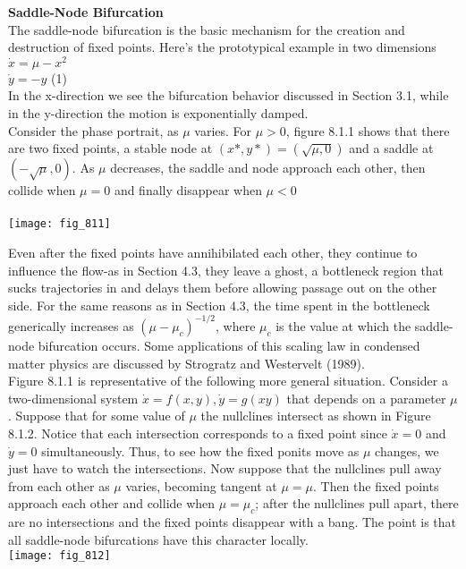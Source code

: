 \documentclass{article}
\newcommand\tab[1][1cm]{\hspace*{#1}}
\begin{document}
\textbf {Saddle-Node Bifurcation} \\ \tab
The saddle-node bifurcation is the basic mechanism for the creation and destruction of fixed points. Here's the prototypical example in two dimensions \\ \tab \tab
$\dot{x}=\mu - x^{2}$ \\
$\dot{y}=-y$ \tab (1) \\
In the x-direction we see the bifurcation behavior discussed in Section 3.1, while in the y-direction the motion is exponentially damped. \\ \tab
Consider the phase portrait, as $\mu$ varies. For $\mu > 0$, figure 8.1.1 shows that there are two fixed points, a stable node at $(x*,y*)=(\sqrt{\mu , 0})$ and a saddle at $(-\sqrt{\mu}, 0)$. As $\mu$ decreases, the saddle and node approach each other, then collide when $\mu = 0$ and finally disappear when $\mu < 0$ \\ 
\\
\texttt{[image: fig\_811]}

Even after the fixed points have annihibilated each other, they continue to influence the flow-as in Section 4.3, they leave a ghost, a bottleneck region that sucks trajectories in and delays them before allowing passage out on the other side. For the same reasons as in Section 4.3, the time spent in the bottleneck generically increases as $(\mu - \mu_{c})^{-1/2}$, where $\mu_{c}$ is the value at which the saddle-node bifurcation occurs. Some applications of this scaling law in condensed matter physics are discussed by Strogratz and Westervelt (1989). \\ \tab Figure 8.1.1 is representative of the following more general situation. Consider a two-dimensional system $\dot{x}=f(x,y), \dot{y}=g(xy)$ that depends on a parameter $\mu$. Suppose that for some value of $\mu$ the nullclines intersect as shown in Figure 8.1.2. Notice that each intersection corresponds to a fixed point since $\dot{x}=0$ and $\dot{y}=0$ simultaneously. Thus, to see how the fixed ponits move as $\mu$ changes, we just have to watch the intersections. Now suppose that the nullclines pull away from each other as $\mu$ varies, becoming tangent at $\mu=\mu$. Then the fixed points approach each other and collide when $\mu=\mu_{c}$; after the nullclines pull apart, there are no intersections and the fixed points disappear with a bang. The point is that all saddle-node bifurcations have this character locally. \\
\texttt{[image: fig\_812]}
\end{document}

